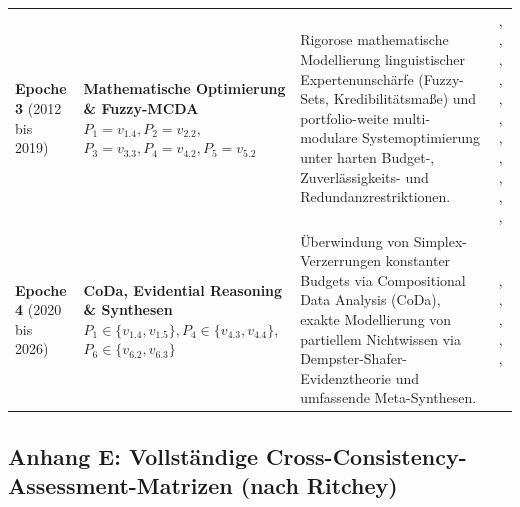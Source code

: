 \begin{landscape}
\begin{xltabular}{\linewidth}{>{\raggedright\arraybackslash}p{2.8cm}>{\raggedright\arraybackslash}p{5.5cm}>{\raggedright\arraybackslash}X>{\raggedright\arraybackslash}p{5.5cm}}
  \addlinespace[6pt]
  \textbf{Epoche 3} \newline (2012 bis 2019) 
    & \textbf{Mathematische Optimierung \& Fuzzy-MCDA} \newline
      $P_1 = v_{1.4}, P_2 = v_{2.2}$, \newline
      $P_3 = v_{3.3}, P_4 = v_{4.2}, P_5 = v_{5.2}$
    & Rigorose mathematische Modellierung linguistischer Expertenunschärfe (Fuzzy-Sets, Kredibilitätsmaße) und portfolio-weite multi-modulare Systemoptimierung unter harten Budget-, Zuverlässigkeits- und Redundanzrestriktionen.
    & \textcite{6YJHIVHG}, \textcite{VRTXHQI7}, \textcite{WZM7DUBY}, \textcite{LYMHTPXS}, \textcite{P9SATBH5}, \textcite{B7ZTQCZZ}, \textcite{JX4RDRDU}, \textcite{NZJEEPAC}, \textcite{QNWK8SAP}, \textcite{UFCEV52H}, \textcite{FVINCQ89}, \textcite{8KF4HAZS} \\
  \addlinespace[6pt]
  \textbf{Epoche 4} \newline (2020 bis 2026) 
    & \textbf{CoDa, Evidential Reasoning \& Synthesen} \newline
      $P_1 \in \{v_{1.4}, v_{1.5}\}, P_4 \in \{v_{4.3}, v_{4.4}\}$, \newline
      $P_6 \in \{v_{6.2}, v_{6.3}\}$
    & Überwindung von Simplex-Verzerrungen konstanter Budgets via Compositional Data Analysis (CoDa), exakte Modellierung von partiellem Nichtwissen via Dempster-Shafer-Evidenztheorie und umfassende Meta-Synthesen.
    & \textcite{UK2X9C4W}, \textcite{5BBYQCJB}, \textcite{RRU375GB}, \textcite{YVWGHAWQ}, \textcite{LNQHES84}, \textcite{LPC92LAP} \\
\end{xltabular}

\newpage
\subsection*{Anhang E: Vollständige Cross-Consistency-Assessment-Matrizen (nach Ritchey)}
\label{subsec:anhang_cca}


\end{landscape}
